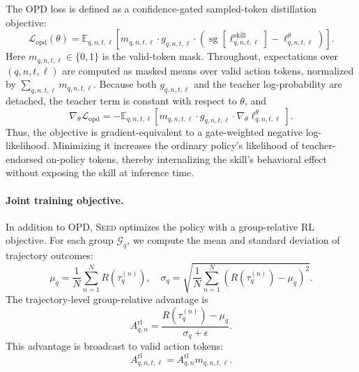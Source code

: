 The OPD loss is defined as a confidence-gated sampled-token distillation objective:
\begin{equation}
\mathcal{L}_{\mathrm{opd}}(\theta)
=
\mathbb{E}_{q,n,t,\ell}
\left[
m_{q,n,t,\ell}
\cdot
g_{q,n,t,\ell}
\cdot
\left(
\operatorname{sg}
\left[
\ell^{\mathrm{skill}}_{q,n,t,\ell}
\right]
-
\ell^{\theta}_{q,n,t,\ell}
\right)
\right].
\label{eq:opd_objective}
\end{equation}
Here $m_{q,n,t,\ell} \in \{0,1\}$ is the valid-token mask. Throughout, expectations over $(q,n,t,\ell)$ are computed as masked means over valid action tokens, normalized by $\sum_{q,n,t,\ell}m_{q,n,t,\ell}$. Because both $g_{q,n,t,\ell}$ and the teacher log-probability are detached, the teacher term is constant with respect to $\theta$, and
\[
\nabla_\theta \mathcal{L}_{\mathrm{opd}}
=
-
\mathbb{E}_{q,n,t,\ell}
\left[
m_{q,n,t,\ell}
\cdot
g_{q,n,t,\ell}
\cdot
\nabla_\theta
\ell^{\theta}_{q,n,t,\ell}
\right].
\]
Thus, the objective is gradient-equivalent to a gate-weighted negative log-likelihood. Minimizing it increases the ordinary policy's likelihood of teacher-endorsed on-policy tokens, thereby internalizing the skill's behavioral effect without exposing the skill at inference time.


\paragraph{Joint training objective.}
In addition to OPD, \textsc{Seed} optimizes the policy with a group-relative RL objective. For each group $\mathcal{G}_q$, we compute the mean and standard deviation of trajectory outcomes:
\[
\mu_q
=
\frac{1}{N}
\sum_{n=1}^{N}
R
\left(
\tau_q^{(n)}
\right),
\quad
\sigma_q
=
\sqrt{
\frac{1}{N}
\sum_{n=1}^{N}
\left(
R
\left(
\tau_q^{(n)}
\right)
-
\mu_q
\right)^2
}.
\]
The trajectory-level group-relative advantage is
\[
A^{\mathrm{rl}}_{q,n}
=
\frac{
R
\left(
\tau_q^{(n)}
\right)
-
\mu_q
}{
\sigma_q+\epsilon
}.
\]
This advantage is broadcast to valid action tokens:
\[
A^{\mathrm{rl}}_{q,n,t,\ell}
=
A^{\mathrm{rl}}_{q,n}
m_{q,n,t,\ell}.
\]

